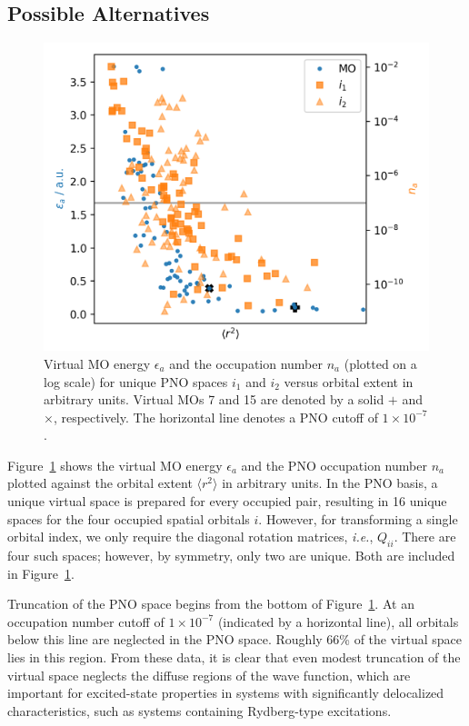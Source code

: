 \subsection{Possible Alternatives} \label{ss:alt}
\begin{figure}
    \centering
    \includegraphics[scale=0.75]{p3/figures/extent.png}
    \caption{Virtual MO energy $\epsilon_a$ and the
    occupation number $n_a$ (plotted on a log scale)
    for unique PNO spaces $i_1$ and $i_2$ 
    versus orbital extent in arbitrary units.
    Virtual MOs 7 and 15 are denoted by a solid $\boldsymbol{+}$ 
    and $\boldsymbol{\times}$, respectively.
    The horizontal line denotes a PNO cutoff 
    of $1\times 10^{-7}$.}
    \label{fig:extent}
\end{figure}
Figure~\ref{fig:extent} shows the virtual MO energy $\epsilon_a$ and the 
PNO occupation number $n_a$ plotted against the orbital extent
$\langle r^2 \rangle$ in arbitrary units. 
In the PNO basis, a unique virtual space is prepared
for every occupied pair, resulting in 16 unique spaces for the four occupied
spatial orbitals $i$. However, for transforming
a single orbital index, we only require the diagonal rotation matrices,
\textit{i.e.}, $Q_{ii}$. There are four such spaces; however, by symmetry,
only two are unique. Both are included in Figure~\ref{fig:extent}. 

Truncation of the PNO space begins from the bottom of Figure~\ref{fig:extent}. 
At an occupation number cutoff of $1\times 10^{-7}$ (indicated by a horizontal
line), all orbitals below this line are neglected in the PNO space. Roughly
66\% of the virtual space lies in this region. From these data, it is clear
that even modest truncation of the virtual space neglects the diffuse 
regions of the wave function, which are important for excited-state
properties in systems with significantly delocalized characteristics,
such as systems containing Rydberg-type excitations.

